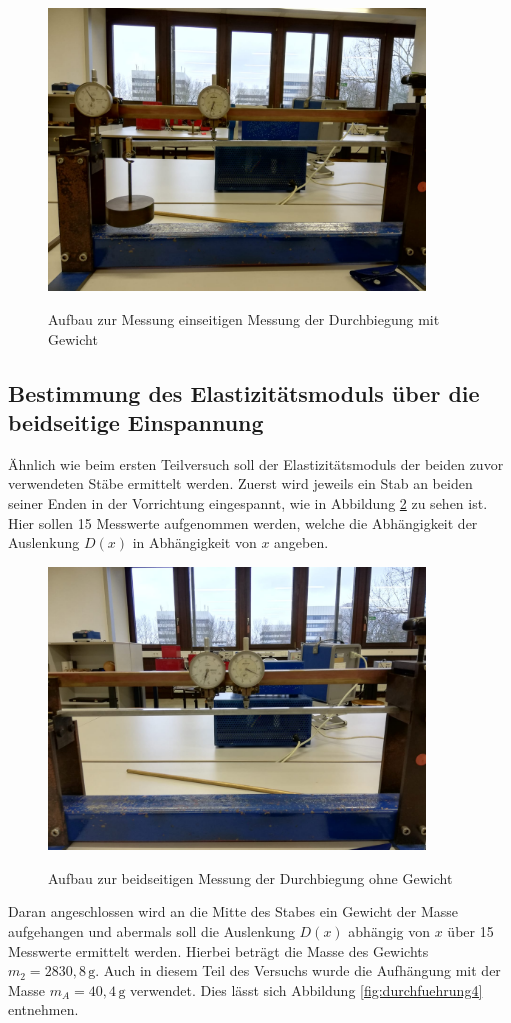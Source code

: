 \begin{figure}[h]
    \centering
    \includegraphics[width=10cm]{2.jpg}
    \label{fig:durchfuehrung2}
    \caption{Aufbau zur Messung einseitigen Messung der Durchbiegung mit Gewicht}
\end{figure}
\noindent


\subsection{Bestimmung des Elastizitätsmoduls über die beidseitige Einspannung}

Ähnlich wie beim ersten Teilversuch soll der Elastizitätsmoduls der beiden zuvor verwendeten 
Stäbe ermittelt werden. Zuerst wird jeweils ein Stab an beiden seiner Enden in der Vorrichtung 
eingespannt, wie in Abbildung \ref{fig:durchfuehrung3} zu sehen ist.
Hier sollen 15 Messwerte aufgenommen werden, welche die Abhängigkeit der Auslenkung $D(x)$ in 
Abhängigkeit von $x$ angeben. 

\begin{figure}[h]
    \centering
    \includegraphics[width=10cm]{3.jpg}
    \label{fig:durchfuehrung3}
    \caption{Aufbau zur beidseitigen Messung der Durchbiegung ohne Gewicht}
\end{figure}
\noindent
Daran angeschlossen wird an die Mitte des Stabes ein Gewicht der 
Masse aufgehangen und abermals soll die Auslenkung $D(x)$ abhängig von $x$ über 15 Messwerte
ermittelt werden. Hierbei beträgt die Masse des Gewichts $m_{2} = 2830,8\, \si{\gram}$. Auch in diesem 
Teil des Versuchs wurde die Aufhängung mit der Masse $m_{A} = 40,4\, \si{\gram}$ verwendet.
 Dies lässt sich Abbildung \ref{fig:durchfuehrung4} entnehmen.

